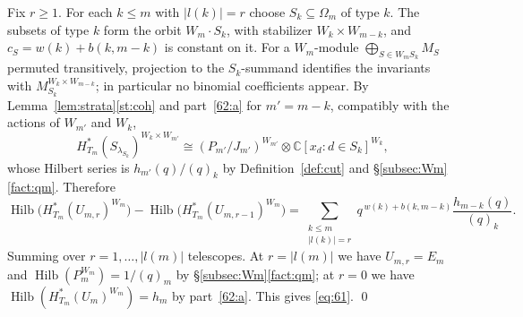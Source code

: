 \documentclass[11pt]{amsart}
\theoremstyle{definition}
\theoremstyle{remark}
\numberwithin{equation}{section}
\newcommand{\C}{\mathbb{C}}
\newcommand{\Om}{\Omega_m}
\DeclareMathOperator{\Hilb}{Hilb}
\begin{document}
Fix $r\ge1$. For each $k\le m$ with $|l(k)|=r$ choose $S_k\subseteq\Om$ of type $k$. The subsets of type
$k$ form the orbit $W_m\cdot S_k$, with stabilizer $W_k\times W_{m-k}$, and $c_S=w(k)+b(k,m-k)$ is
constant on it. For a $W_m$-module $\bigoplus_{S\in W_m S_k}M_S$ permuted transitively, projection to the
$S_k$-summand identifies the invariants with $M_{S_k}^{W_k\times W_{m-k}}$; in particular no binomial
coefficients appear. By Lemma~\ref{lem:strata}\ref{st:coh} and part~\ref{62:a} for $m'=m-k$, compatibly
with the actions of $W_{m'}$ and $W_k$,
\[
  H^*_{T_m}(S_{\lambda_{S_k}})^{W_k\times W_{m'}}\cong (P_{m'}/J_{m'})^{W_{m'}}\otimes\C[x_d:d\in S_k]^{W_k},
\]
whose Hilbert series is $h_{m'}(q)/(q)_k$ by Definition~\ref{def:cut} and
\S\ref{subsec:Wm}\ref{fact:qm}. Therefore
\[
  \Hilb\big(H^*_{T_m}(U_{m,r})^{W_m}\big)-\Hilb\big(H^*_{T_m}(U_{m,r-1})^{W_m}\big)
  =\sum_{\substack{k\le m\\ |l(k)|=r}}q^{\,w(k)+b(k,m-k)}\frac{h_{m-k}(q)}{(q)_k}.
\]
Summing over $r=1,\dots,|l(m)|$ telescopes. At $r=|l(m)|$ we have $U_{m,r}=E_m$ and
$\Hilb(P_m^{W_m})=1/(q)_m$ by \S\ref{subsec:Wm}\ref{fact:qm}; at $r=0$ we have
$\Hilb(H^*_{T_m}(U_m)^{W_m})=h_m$ by part~\ref{62:a}. This gives \eqref{eq:61}. \qed
\end{document}
